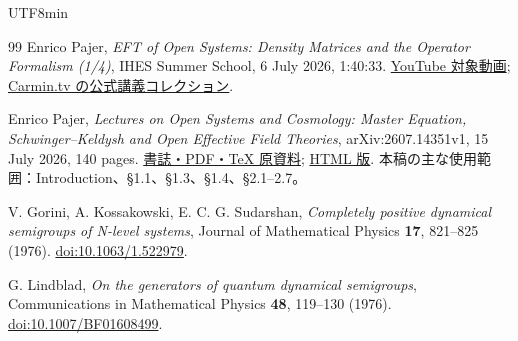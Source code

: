 \documentclass[11pt,a4paper]{article}
\numberwithin{equation}{section}
\begin{document}
\begin{CJK*}{UTF8}{min}
\begin{thebibliography}{99}
Enrico Pajer, \emph{EFT of Open Systems: Density Matrices and the Operator Formalism (1/4)}, IHES Summer School, 6 July 2026, 1:40:33.
\href{https://www.youtube.com/watch?v=3gDSaNy1O7Y}{YouTube 対象動画};
\href{https://www.carmin.tv/en/collections/2026-ihes-summer-school-cosmological-correlators}{Carmin.tv の公式講義コレクション}.

Enrico Pajer, \emph{Lectures on Open Systems and Cosmology: Master Equation, Schwinger--Keldysh and Open Effective Field Theories}, arXiv:2607.14351v1, 15 July 2026, 140 pages.
\href{https://arxiv.org/abs/2607.14351v1}{書誌・PDF・TeX 原資料};
\href{https://arxiv.org/html/2607.14351v1}{HTML 版}.
本稿の主な使用範囲：Introduction、§1.1、§1.3、§1.4、§2.1--2.7。

V. Gorini, A. Kossakowski, E. C. G. Sudarshan,
\emph{Completely positive dynamical semigroups of N-level systems},
Journal of Mathematical Physics \textbf{17}, 821--825 (1976).
\href{https://doi.org/10.1063/1.522979}{doi:10.1063/1.522979}.

G. Lindblad, \emph{On the generators of quantum dynamical semigroups},
Communications in Mathematical Physics \textbf{48}, 119--130 (1976).
\href{https://doi.org/10.1007/BF01608499}{doi:10.1007/BF01608499}.
\end{thebibliography}

\end{CJK*}
\end{document}
